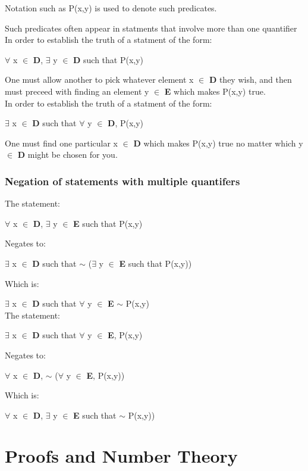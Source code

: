 \documentclass{article}
\begin{document}
Notation such as P(x,y) is used to denote such predicates.

Such predicates often appear in statments that involve more than one quantifier \\

In order to establish the truth of a statment of the form:

$\forall$ x $\in$ \textbf{D}, $\exists$ y $\in$ \textbf{D} such that P(x,y)

One must allow another to pick whatever element x $\in$ \textbf{D} they wish, and then must preceed with finding an element
y $\in$ \textbf{E} which makes P(x,y) true. \\

In order to establish the truth of a statment of the form:

$\exists$ x $\in$ \textbf{D} such that $\forall$ y $\in$ \textbf{D}, P(x,y)

One must find one particular x $\in$ \textbf{D} which makes P(x,y) true no matter which y $\in$ \textbf{D} might be chosen
for you.

\subsubsection{Negation of statements with multiple quantifers}

The statement: 

$\forall$ x $\in$ \textbf{D}, $\exists$ y $\in$ \textbf{E} such that P(x,y)

Negates to: 

$\exists$ x $\in$ \textbf{D} such that $\sim$ ($\exists$ y $\in$ \textbf{E} such that P(x,y))

Which is:

$\exists$ x $\in$ \textbf{D} such that $\forall$ y $\in$ \textbf{E} $\sim$ P(x,y) \\


The statement: 

$\exists$ x $\in$ \textbf{D} such that $\forall$ y $\in$ \textbf{E}, P(x,y)

Negates to:

$\forall$ x $\in$ \textbf{D}, $\sim$ ($\forall$ y $\in$ \textbf{E}, P(x,y))

Which is:

$\forall$ x $\in$ \textbf{D}, $\exists$ y $\in$ \textbf{E} such that $\sim$ P(x,y))

\section{Proofs and Number Theory}
\end{document}
